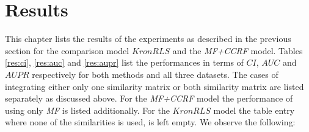 \section{Results}
\label{chapt:res}
This chapter lists the results of the experiments as described in the previous section for the comparison model $KronRLS$ and the \textit{MF+CCRF} model.
Tables \ref{res:ci}, \ref{res:auc} and \ref{res:aupr} list the performances in terms of $CI$, $AUC$ and $AUPR$ respectively for both methods and all three datasets. The cases of integrating either only one similarity matrix or both similarity matrix are listed separately as discussed above. For the \textit{MF+CCRF} model the performance of using only \textit{MF} is listed additionally. For the $KronRLS$ model the table entry where none of the similarities is used, is left empty. We observe the following:

